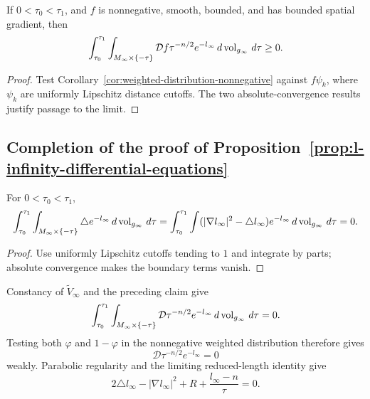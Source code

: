 \begin{corollary}\label{cor:weak-inequality-nonnegative-integral}
\label{weakneg}

If $0<\tau_0<\tau_1$, and $f$ is nonnegative, smooth, bounded, and
has bounded spatial gradient, then
\[
 \int_{\tau_0}^{\tau_1}\int_{M_\infty\times\{-\tau\}}
 \mathcal D f\tau^{-n/2}e^{-l_\infty}
 \,d\operatorname{vol}_{g_\infty}\,d\tau\geq0.
\]
\end{corollary}
\begin{proof}
\sketch
{}
Test Corollary~\ref{cor:weighted-distribution-nonnegative} against
$f\psi_k$, where $\psi_k$ are uniformly Lipschitz distance cutoffs.
The two absolute-convergence results justify passage to the limit.
\end{proof}

\subsection{Completion of the proof of
Proposition~{\ref{prop:l-infinity-differential-equations}}}\label{sect9.2.5}

\begin{claim}\label{claim:laplacian-integral-vanishes}

For $0<\tau_0<\tau_1$,
\[
 \int_{\tau_0}^{\tau_1}\int_{M_\infty\times\{-\tau\}}
 \triangle e^{-l_\infty}\,d\operatorname{vol}_{g_\infty}\,d\tau
 =\int_{\tau_0}^{\tau_1}\int
 (|\nabla l_\infty|^2-\triangle l_\infty)e^{-l_\infty}
 \,d\operatorname{vol}_{g_\infty}\,d\tau=0.
\]
\end{claim}
\begin{proof}
\sketch
{}
Use uniformly Lipschitz cutoffs tending to $1$ and integrate by
parts; absolute convergence makes the boundary terms vanish.
\end{proof}

Constancy of $\widetilde V_\infty$ and the preceding claim give
\begin{equation}\label{tildeD}
 \int_{\tau_0}^{\tau_1}\int_{M_\infty\times\{-\tau\}}
 \mathcal D\tau^{-n/2}e^{-l_\infty}
 \,d\operatorname{vol}_{g_\infty}\,d\tau=0.
\end{equation}
Testing both $\varphi$ and $1-\varphi$ in the nonnegative weighted
distribution therefore gives
\begin{equation}\label{constcon}
 \mathcal D\tau^{-n/2}e^{-l_\infty}=0
\end{equation}
weakly. Parabolic regularity and the limiting reduced-length identity
give
\begin{equation}\label{wk=}
 2\triangle l_\infty-|\nabla l_\infty|^2+R
 +\frac{l_\infty-n}{\tau}=0.
\end{equation}

